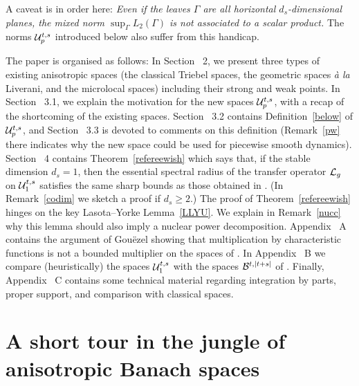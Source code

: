 \documentclass[10pt,twoside]{amsart}
\begin{document}
A caveat is in order here: {\it Even if  the leaves $\Gamma$ are all
horizontal $d_s$-dimensional planes, the mixed norm $\sup_\Gamma L_2(\Gamma)$ is not associated to
a scalar product.}  The norms  $\mathcal{U}^{t,s}_p$  introduced below also suffer from this handicap.


\medskip

The paper is organised as follows: In Section~ 2, we present  three types of existing
anisotropic spaces (the classical Triebel spaces, the geometric spaces {\it \`a la}
Liverani, and the microlocal spaces) including their strong and weak
points. In Section ~3.1, we explain the
motivation for the  new spaces $\mathcal{U}^{t,s}_p$, with a recap of the shortcoming of the 
existing spaces.
Section ~3.2 contains Definition~\ref{below} of $\mathcal{U}^{t,s}_p$, and Section ~3.3
is devoted to comments on this definition (Remark~\ref{pw} there indicates
why the new space could be used for piecewise smooth dynamics). Section ~4 contains Theorem~\ref{refereewish}
which says that, if the stable dimension $d_s=1$, then the essential spectral radius of the transfer operator
$\mathcal{L}_g$ on $\mathcal{U}^{t,s}_1$ satisfies the same sharp bounds as those obtained in \cite{BT2}.
(In Remark~\ref{codim} we sketch a proof if $d_s\ge 2$.)
The proof of Theorem~\ref{refereewish}  hinges on the key Lasota--Yorke Lemma~\ref{LLYU}. We
explain in Remark~\ref{nucc} why this lemma should also imply a nuclear power decomposition.
Appendix~ A contains the argument of Gou\"ezel showing that multiplication by
characteristic functions is not a bounded multiplier on the spaces
of \cite{BT1}. In Appendix~ B we compare (heuristically) the spaces
$\mathcal{U}^{t,s}_1$ with the spaces $\mathcal{B}^{t,|t+s|}$ of \cite{GL1}.
Finally, Appendix ~C contains some technical material regarding integration by parts,
proper support, and comparison with classical spaces.





\section{A short   tour in the jungle of anisotropic Banach spaces}
\end{document}
